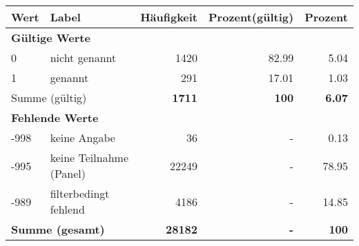      \begin{longtable}{lXrrr}
     \toprule
     \textbf{Wert} & \textbf{Label} & \textbf{Häufigkeit} & \textbf{Prozent(gültig)} & \textbf{Prozent} \\
     \endhead
     \midrule
     \multicolumn{5}{l}{\textbf{Gültige Werte}}\\

     0 &
     \multicolumn{1}{X}{ nicht genannt   } &


       \num{1420} &
       \num[round-mode=places,round-precision=2]{82.99} &
         \num[round-mode=places,round-precision=2]{5.04} \\

     1 &
     \multicolumn{1}{X}{ genannt   } &


       \num{291} &
       \num[round-mode=places,round-precision=2]{17.01} &
         \num[round-mode=places,round-precision=2]{1.03} \\
     \midrule
     \multicolumn{2}{l}{Summe (gültig)} &
       \textbf{\num{1711}} &
     \textbf{100} &
       \textbf{\num[round-mode=places,round-precision=2]{6.07}} \\
     \multicolumn{5}{l}{\textbf{Fehlende Werte}}\\
       -998 &
       keine Angabe &
         \num{36} &
        - &
         \num[round-mode=places,round-precision=2]{0.13} \\
       -995 &
       keine Teilnahme (Panel) &
         \num{22249} &
        - &
         \num[round-mode=places,round-precision=2]{78.95} \\
       -989 &
       filterbedingt fehlend &
         \num{4186} &
        - &
         \num[round-mode=places,round-precision=2]{14.85} \\
     \midrule
     \multicolumn{2}{l}{\textbf{Summe (gesamt)}} &
          \textbf{\num{28182}} &
        \textbf{-} &
        \textbf{100} \\
     \bottomrule
     \end{longtable}
     
